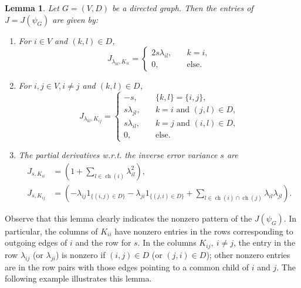 \documentclass[12pt,reqno]{amsart}
\theoremstyle{plain}
\newtheorem{lemma}[theorem]{Lemma}
\theoremstyle{definition}
\DeclareMathOperator{\ch}{ch}
\begin{document}
\begin{lemma}\label{J}
Let $G = (V, D)$ be a directed graph. Then the entries of $J = J(\psi_G)$ are given by:
\begin{enumerate}[(1)]
\item For $i\in V$ and $(k,l)\in D$,
$$
J_{\lambda_{kl},K_{ii}}=
\begin{cases}
2s\lambda_{il}, &\quad k=i,\\
0, &\quad \text{else}.
\end{cases}
$$
\item
For $i,j\in V, i\neq j$ and $(k,l)\in D$,
$$
J_{\lambda_{kl},K_{ij}}=
\begin{cases}
-s, &\quad \{k,l\}=\{i,j\},\\
s\lambda_{jl},&\quad k=i \text{ and } (j,l)\in D,\\
s\lambda_{il},&\quad k=j \text{ and } (i,l)\in D,\\
0,&\quad \text{else}.
\end{cases}
$$
\item The partial derivatives w.r.t. the inverse error variance $s$ are
\begin{align*}
J_{s,K_{ii}}&=\left(1+\sum_{l \in {\ch}(i)} \lambda_{il}^2\right),\\
J_{s,K_{ij}}&=\left(-\lambda_{ij}1_{\{(i,j)\in D\}}-\lambda_{ji}1_{\{(j,i)\in D\}}+\sum_{l \in { \ch}(i)\cap{\ch}(j)} \lambda_{il}\lambda_{jl}\right).
\end{align*}
\end{enumerate}
\end{lemma}
Observe that this lemma clearly indicates the nonzero pattern of the $J(\psi_G)$. In particular, the columns of $K_{ii}$ have nonzero entries in the rows corresponding to outgoing edges of $i$ and the row for $s$. In the columns $K_{ij},\ i\neq j$, the entry in the row $\lambda_{ij}$ (or $\lambda_{ji}$) is nonzero if $(i,j)\in D$ (or $(j,i)\in D$); other nonzero entries are in the row pairs with those edges pointing to a common child of $i$ and $j$. The following example illustrates this lemma. 
\end{document}
